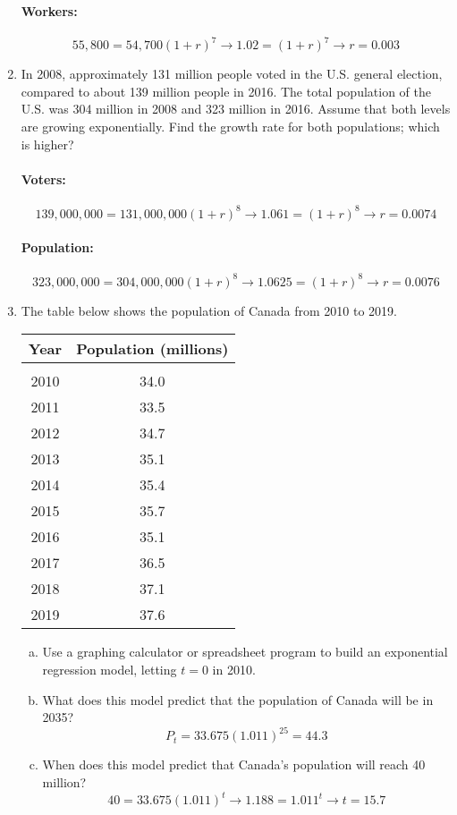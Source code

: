\begin{enumerate}
\paragraph{Workers:} \[55,800 = 54,700(1 + r)^7 \longrightarrow 1.02 = (1 + r)^7 \longrightarrow r = 0.003\]

\item In 2008, approximately 131 million people voted in the U.S. general election, compared to about 139 million people in 2016.  The total population of the U.S. was 304 million in 2008 and 323 million in 2016.  Assume that both levels are growing exponentially.  Find the growth rate for both populations; which is higher? 
\paragraph{Voters:} \[139,000,000 = 131,000,000(1 + r)^8 \longrightarrow 1.061 = (1 + r)^8 \longrightarrow r = 0.0074\]
\paragraph{Population:} \[323,000,000 = 304,000,000(1 + r)^8 \longrightarrow 1.0625 = (1 + r)^8 \longrightarrow r = 0.0076\]

\item The table below shows the population of Canada from 2010 to 2019.
\begin{center}
\begin{tabular}{c c}
\textbf{Year} & \textbf{Population (millions)}\\
\hline
 & \\
2010 & 34.0\\
2011 & 33.5\\
2012 & 34.7\\
2013 & 35.1\\
2014 & 35.4\\
2015 & 35.7\\
2016 & 35.1\\
2017 & 36.5\\
2018 & 37.1\\
2019 & 37.6
\end{tabular}
\end{center}
\begin{enumerate}[(a)]
\item Use a graphing calculator or spreadsheet program to build an exponential regression model, letting $t=0$ in 2010. 
\item What does this model predict that the population of Canada will be in 2035? 
\[P_t = 33.675(1.011)^{25} = 44.3\]
\item When does this model predict that Canada's population will reach 40 million? 
\[40 = 33.675(1.011)^t \longrightarrow 1.188 = 1.011^t \longrightarrow t = 15.7\]
\end{enumerate}


\end{enumerate}
